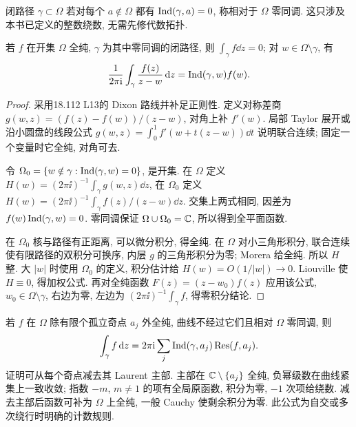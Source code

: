 \begin{definition}
闭路径 $\gamma\subset\Omega$ 若对每个 $a\notin\Omega$ 都有 $\operatorname{Ind}(\gamma,a)=0$, 称相对于 $\Omega$ 零同调. 这只涉及本书已定义的整数绕数, 无需先修代数拓扑.
\end{definition}
\begin{theorem}\label{thm:generalcauchy}
若 $f$ 在开集 $\Omega$ 全纯, $\gamma$ 为其中零同调的闭路径, 则 $\int_\gamma f\dd z=0$; 对 $w\in\Omega\setminus\gamma$, 有
\[
\frac1{2\pi\mathrm i}\int_\gamma\frac{f(z)}{z-w}\,\mathrm d z=\operatorname{Ind}(\gamma,w)f(w).
\]
\end{theorem}
\begin{proof}
采用18.112 L13的 Dixon 路线并补足正则性. 定义对称差商 $g(w,z)=(f(z)-f(w))/(z-w)$, 对角上补 $f'(w)$. 局部 Taylor 展开或沿小圆盘的线段公式 $g(w,z)=\int_0^1f'(w+t(z-w))\dd t$ 说明联合连续; 固定一个变量时它全纯, 对角可去.

令 $\Omega_0=\{w\notin\gamma:\operatorname{Ind}(\gamma,w)=0\}$, 是开集. 在 $\Omega$ 定义 $H(w)=(2\pi\ii)^{-1}\int_\gamma g(w,z)\dd z$, 在 $\Omega_0$ 定义 $H(w)=(2\pi\ii)^{-1}\int_\gamma f(z)/(z-w)\dd z$. 交集上两式相同, 因差为 $f(w)\operatorname{Ind}(\gamma,w)=0$. 零同调保证 $\Omega\cup\Omega_0=\mathbb C$, 所以得到全平面函数.

在 $\Omega_0$ 核与路径有正距离, 可以微分积分, 得全纯. 在 $\Omega$ 对小三角形积分, 联合连续使有限路径的双积分可换序, 内层 $g$ 的三角形积分为零; Morera 给全纯. 所以 $H$ 整. 大 $|w|$ 时使用 $\Omega_0$ 的定义, 积分估计给 $H(w)=O(1/|w|)\to0$. Liouville 使 $H\equiv0$, 得加权公式. 再对全纯函数 $F(z)=(z-w_0)f(z)$ 应用该公式, $w_0\in\Omega\setminus\gamma$, 右边为零, 左边为 $(2\pi\ii)^{-1}\int_\gamma f$, 得零积分结论.
\end{proof}
若 $f$ 在 $\Omega$ 除有限个孤立奇点 $a_j$ 外全纯, 曲线不经过它们且相对 $\Omega$ 零同调, 则
\[
\int_\gamma f\,\mathrm d z=2\pi\mathrm i\sum_j\operatorname{Ind}(\gamma,a_j)\operatorname{Res}(f,a_j).
\]
证明可从每个奇点减去其 Laurent 主部. 主部在 $\mathbb C\setminus\{a_j\}$ 全纯, 负幂级数在曲线紧集上一致收敛; 指数 $-m$, $m\ne1$ 的项有全局原函数, 积分为零, $-1$ 次项给绕数. 减去主部后函数可补为 $\Omega$ 上全纯, 一般 Cauchy 使剩余积分为零. 此公式为自交或多次绕行时明确的计数规则.

